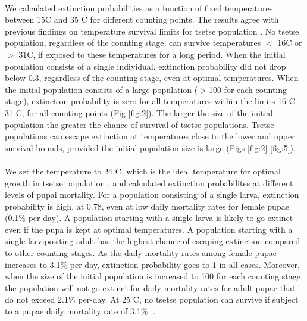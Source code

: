 \documentclass[smallextended]{svjour3}
\begin{document}
\paragraph{}
We calculated extinction probabilities as a function of fixed temperatures between 15\degree C and 35 \degree C for different counting points. The results agree with previous findings on temperature survival limits for tsetse population \cite{Edney1962,Kleynhans2011e,Pagabeleguem2016f,Are2019}. No tsetse population, regardless of the counting stage, can survive temperatures $<$ 16\degree C or $>$ 31\degree C, if exposed to these temperatures for a long period. When the initial population consists of a single individual, extinction probability did not drop below 0.3, regardless of the counting stage, even at optimal temperatures. When the initial population consists of a large population ($>$100 for each counting stage), extinction probability is zero for all temperatures within the limits 16 \degree C - 31 \degree  C, for all counting points (Fig \ref{fig:2}). The larger the size of the initial population the greater the chance of survival of tsetse populations. Tsetse populations can escape extinction at temperatures close to the lower and upper survival bounds, provided the initial population size is large (Figs \ref{fig:2}-\ref{fig:5}).
\paragraph{}
We set the temperature to 24 \degree C, which is the ideal temperature for optimal growth in tsetse population
\cite{Pagabeleguem2016f,Are2019}, and calculated extinction probabilites at different levels of pupal mortality. For a population consisting of a single larva, extinction probability is high, at 0.78, even at low daily mortality rates for female pupae (0.1\% per-day). A population starting with a single larva is likely to go extinct even if the pupa is kept at optimal temperatures. A population starting with a single larvipositing adult has the highest chance of escaping extinction compared to other counting stages. As the daily mortality rates among female pupae increases to 3.1\% per day, extinction probability goes to 1 in all cases. Moreover, when the size of the initial population is increased to 100 for each counting stage, the population will not go extinct for daily mortality rates for adult pupae that do not exceed 2.1\% per-day. At 25 \degree C, no tsetse population can survive if subject to a pupae daily mortality rate of 3.1\%. \cite{Hargrove2019a}. 
\end{document}
